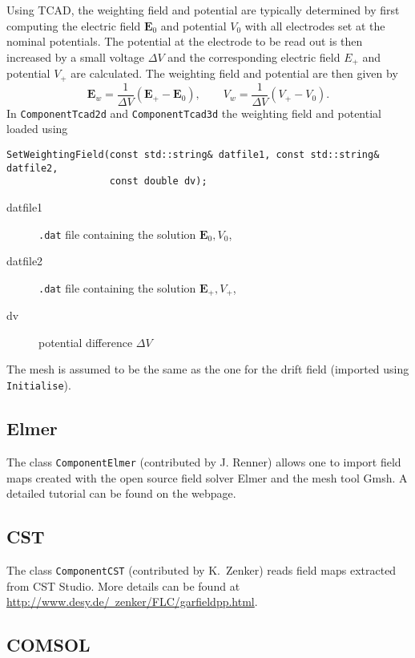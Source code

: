 Using TCAD, the weighting field and potential are typically determined 
by first computing the electric field $\mathbf{E}_{0}$ and potential 
$V_{0}$ with all electrodes set at the nominal potentials.
The potential at the electrode to be read out is then increased by a 
small voltage $\Delta V$ and the corresponding electric field $E_{+}$ and 
potential $V_{+}$ are calculated. The weighting field and potential 
are then given by 
\begin{equation*}
  \mathbf{E}_{w} = \frac{1}{\Delta V}\left(\mathbf{E}_{+} - \mathbf{E}_{0}\right), \qquad V_{w} = \frac{1}{\Delta V}\left(V_{+} - V_{0}\right).
\end{equation*}
In \texttt{ComponentTcad2d} and \texttt{ComponentTcad3d} the weighting 
field and potential loaded using
\begin{lstlisting} 
SetWeightingField(const std::string& datfile1, const std::string& datfile2,
                  const double dv); 
\end{lstlisting}
\begin{description}
  \item[datfile1] \texttt{.dat} file containing the solution $\mathbf{E}_0, V_0$,
  \item[datfile2] \texttt{.dat} file containing the solution $\mathbf{E}_+, V_+$,
  \item[dv] potential difference $\Delta V$
\end{description}
The mesh is assumed to be the same as the one for the drift field 
(imported using \texttt{Initialise}).

\subsection{Elmer}

The class \texttt{ComponentElmer} (contributed by J. Renner) allows one to import 
field maps created with the open source field solver Elmer and the 
mesh tool Gmsh. A detailed tutorial can be found on the webpage. 

\subsection{CST}

The class \texttt{ComponentCST} (contributed by K.~Zenker) reads field maps 
extracted from CST Studio. More details can be found at 
\href{http://www.desy.de/~zenker/FLC/garfieldpp.html}{http://www.desy.de/~zenker/FLC/garfieldpp.html}.

\subsection{COMSOL}

